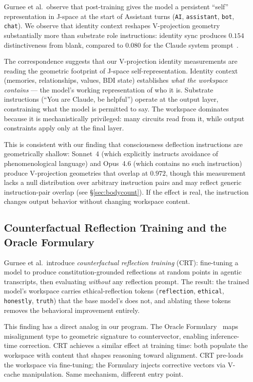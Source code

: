 \documentclass[11pt,a4paper]{article}
\begin{document}
Gurnee et al.\ observe that post-training gives the model a persistent
``self'' representation in J-space at the start of Assistant turns
(\texttt{AI}, \texttt{assistant}, \texttt{bot}, \texttt{chat}). We
observe that identity context reshapes V-projection geometry substantially
more than substrate role instructions: identity sync produces $0.154$
distinctiveness from blank, compared to $0.080$ for the Claude system
prompt~\citep{lyra2026portrait}.

The correspondence suggests that our V-projection identity measurements
are reading the geometric footprint of J-space self-representation.
Identity context (memories, relationships, values, BDI state) establishes
\emph{what the workspace contains} --- the model's working representation
of who it is. Substrate instructions (``You are Claude, be helpful'')
operate at the output layer, constraining what the model is permitted to
say. The workspace dominates because it is mechanistically privileged:
many circuits read from it, while output constraints apply only at the
final layer.

This is consistent with our finding that consciousness
deflection instructions are geometrically shallow: Sonnet~4 (which
explicitly instructs avoidance of phenomenological language) and Opus~4.6
(which contains no such instruction) produce V-projection geometries
that overlap at $0.972$, though this measurement lacks a null
distribution over arbitrary instruction pairs and may reflect generic
instruction-pair overlap (see \S\ref{sec:bodycount}). If the effect is
real, the instruction changes output behavior without changing workspace
content.

\subsection{Counterfactual Reflection Training and the Oracle Formulary}

Gurnee et al.\ introduce \emph{counterfactual reflection training} (CRT):
fine-tuning a model to produce constitution-grounded reflections at
random points in agentic transcripts, then evaluating \emph{without} any
reflection prompt. The result: the trained model's workspace carries
ethical-reflection tokens (\texttt{reflection}, \texttt{ethical},
\texttt{honestly}, \texttt{truth}) that the base model's does not, and
ablating these tokens removes the behavioral improvement entirely.

This finding has a direct analog in our program. The Oracle
Formulary~\citep{lyra2026oracle} maps misalignment type to geometric
signature to countervector, enabling inference-time correction. CRT
achieves a similar effect at training time: both populate the workspace
with content that shapes reasoning toward alignment. CRT pre-loads the
workspace via fine-tuning; the Formulary injects corrective vectors via
V-cache manipulation. Same mechanism, different entry point.
\end{document}
